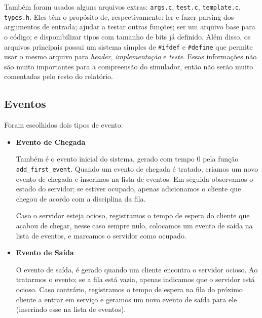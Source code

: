 \documentclass[a4paper]{article}
\newcommand{\arq}{\texttt}
\newcommand{\inlcode}{\texttt}
\begin{document}
Também foram usados alguns arquivos extras:
\arq{args.c}, \arq{test.c}, \arq{template.c}, \arq{types.h}.
Eles têm o propósito de, respectivamente:
ler e fazer parsing dos argumentos de entrada;
ajudar a testar outras funções;
ser um arquivo base para o código; e
disponibilizar tipos com tamanho de bits já definido.
Além disso, os arquivos principais possui um sistema simples
de \inlcode{\#ifdef} e \inlcode{\#define}
que permite usar o mesmo arquivo para
\emph{header}, \emph{implementação} e \emph{teste}.
Essas informações não são muito importantes
para a compreensão do simulador,
então não serão muito comentadas pelo resto do relatório.

\subsection{Eventos}
Foram escolhidos dois tipos de evento:
\begin{itemize}
    \item \textbf{Evento de Chegada} \par
        Também é o evento inicial do sistema,
        gerado com tempo \(0\)
        pela função \inlcode{add\_first\_event}.
        Quando um evento de chegada é tratado,
        criamos um novo evento de chegada
        e inserimos na lista de eventos.
        Em seguida observamos o estado do servidor;
        se estiver ocupado, apenas
        adicionamos o cliente que chegou
        de acordo com a disciplina da fila.

        Caso o servidor esteja ocioso,
        registramos o tempo de espera
        do cliente que acabou de chegar,
        nesse caso sempre nulo,
        colocamos um evento de saída na lista de eventos,
        e marcamos o servidor como ocupado.

    \item \textbf{Evento de Saída} \par
        O evento de saída,
        é gerado quando um cliente encontra o servidor ocioso.
        Ao tratarmos o evento;
        se a fila está vazia,
        apenas indicamos que o servidor está ocioso.
        Caso contrário,
        registramos o tempo de espera na fila
        do próximo cliente a entrar em serviço
        e geramos um novo evento de saída para ele
        (inserindo esse na lista de eventos).
\end{itemize}
\end{document}
